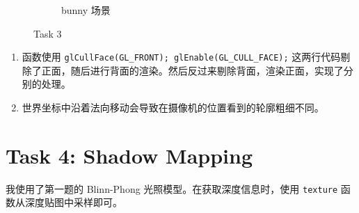 \documentclass[UTF8]{ctexart}
\begin{document}
\begin{figure}[htbp]
\begin{subfigure}[b]{0.49\textwidth}
        \caption{bunny 场景}
    \end{subfigure}
    \caption*{Task 3}
\end{figure}

\begin{enumerate}
    \item 函数使用 \texttt{glCullFace(GL\_FRONT); glEnable(GL\_CULL\_FACE);} 这两行代码剔除了正面，随后进行背面的渲染。然后反过来剔除背面，渲染正面，实现了分别的处理。
    \item 世界坐标中沿着法向移动会导致在摄像机的位置看到的轮廓粗细不同。
\end{enumerate}

\section*{Task 4: Shadow Mapping}

我使用了第一题的 Blinn-Phong 光照模型。在获取深度信息时，使用 \texttt{texture} 函数从深度贴图中采样即可。
\end{document}
